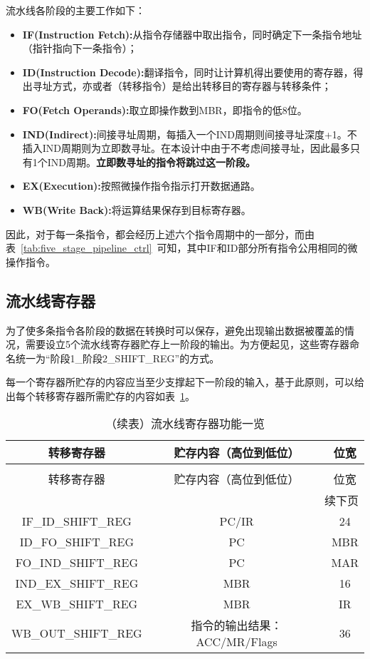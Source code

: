 \documentclass[lang=cn,a4paper,newtx]{elegantpaper}
\begin{document}
流水线各阶段的主要工作如下：
\begin{itemize}
  \item \textbf{IF(Instruction Fetch):}从指令存储器中取出指令，同时确定下一条指令地址（指针指向下一条指令）；
  \item \textbf{ID(Instruction Decode):}翻译指令，同时让计算机得出要使用的寄存器，得出寻址方式，亦或者（转移指令）是给出转移目的寄存器与转移条件；
  \item \textbf{FO(Fetch Operands):}取立即操作数到MBR，即指令的低8位。
  \item \textbf{IND(Indirect):}间接寻址周期，每插入一个IND周期则间接寻址深度+1。不插入IND周期则为立即数寻址。在本设计中由于不考虑间接寻址，因此最多只有1个IND周期。\textbf{立即数寻址的指令将跳过这一阶段。}
  \item \textbf{EX(Execution):}按照微操作指令指示打开数据通路。
  \item \textbf{WB(Write Back):}将运算结果保存到目标寄存器。
\end{itemize}

因此，对于每一条指令，都会经历上述六个指令周期中的一部分，而由表~\ref{tab:five_stage_pipeline_ctrl}~可知，其中IF和ID部分所有指令公用相同的微操作指令。
\subsection{流水线寄存器}
为了使多条指令各阶段的数据在转换时可以保存，避免出现输出数据被覆盖的情况，需要设立5个流水线寄存器贮存上一阶段的输出。为方便起见，这些寄存器命名统一为“阶段1\_阶段2\_SHIFT\_REG”的方式。

每一个寄存器所贮存的内容应当至少支撑起下一阶段的输入，基于此原则，可以给出每个转移寄存器所需贮存的内容如表~\ref{tab:pipeline:shiftreg}。
\begin{longtable}{c c c}
  \caption{流水线寄存器功能一览} \label{tab:pipeline:shiftreg} \\
  \toprule
  转移寄存器 & 贮存内容（高位到低位）  & 位宽   \\
  \midrule
  \endfirsthead

  \caption[]{（续表）流水线寄存器功能一览} \\
  \toprule
  转移寄存器 & 贮存内容（高位到低位）  & 位宽  \\
  \midrule
  \endhead

  \midrule
  \multicolumn{3}{r}{续下页} \\
  \midrule
  \endfoot

  \bottomrule
  \endlastfoot

  IF\_ID\_SHIFT\_REG  & PC/IR   & 24  \\
  ID\_FO\_SHIFT\_REG  & PC    & MBR  \\
  FO\_IND\_SHIFT\_REG  & PC    & MAR  \\
  IND\_EX\_SHIFT\_REG  & MBR   & 16  \\
  EX\_WB\_SHIFT\_REG  & MBR   & IR  \\
  WB\_OUT\_SHIFT\_REG & 指令的输出结果：ACC/MR/Flags & 36

\end{longtable}
\end{document}
